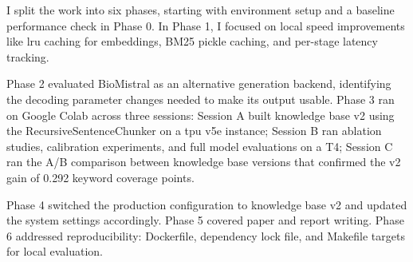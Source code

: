 I split the work into six phases, starting with environment setup and a baseline performance check in Phase 0. In Phase 1, I focused on local speed improvements like \ac{lru} caching for embeddings, BM25 pickle caching, and per-stage latency tracking.

Phase 2 evaluated BioMistral as an alternative generation backend, identifying the decoding parameter changes needed to make its output usable. Phase 3 ran on Google Colab across three sessions: Session A built knowledge base v2 using the RecursiveSentenceChunker on a \ac{tpu} v5e instance; Session B ran ablation studies, calibration experiments, and full model evaluations on a T4; Session C ran the A/B comparison between knowledge base versions that confirmed the v2 gain of 0.292 keyword coverage points.

Phase 4 switched the production configuration to knowledge base v2 and updated the system settings accordingly. Phase 5 covered paper and report writing. Phase 6 addressed reproducibility: Dockerfile, dependency lock file, and Makefile targets for local evaluation.
